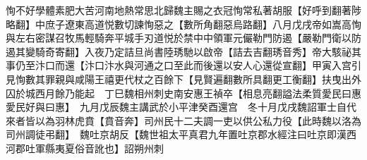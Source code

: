 恂不好學體素肥大苦河南地熱常思北歸魏主賜之衣冠恂常私著胡服【好呼到翻著陟略翻】中庶子遼東高道悦數切諫恂惡之【數所角翻惡烏路翻】八月戊戌帝如嵩高恂與左右密謀召牧馬輕騎奔平城手刃道悦於禁中中領軍元儼勒門防遏【嚴勒門衛以防遏其變騎奇寄翻】入夜乃定詰旦尚書陸琇馳以啟帝【詰去吉翻琇音秀】帝大駭祕其事仍至汴口而還【汴口汴水與河通之口至此而後還以安人心還從宣翻】甲寅入宫引見恂數其罪親與咸陽王禧更代杖之百餘下【見賢遍翻數所具翻更工衡翻】扶曳出外囚於城西月餘乃能起　丁巳魏相州刺史南安惠王禎卒【相息亮翻謚法柔質愛民曰惠愛民好與曰惠】　九月戊辰魏主講武於小平津癸酉還宫　冬十月戊戌魏詔軍士自代來者皆以為羽林虎賁【賁音奔】司州民十二夫調一吏以供公私力役【此時魏以洛為司州調徒弔翻】　魏吐京胡反【魏世祖太平真君九年置吐京郡水經注曰吐京即漢西河郡吐軍縣夷夏俗音訛也】詔朔州刺